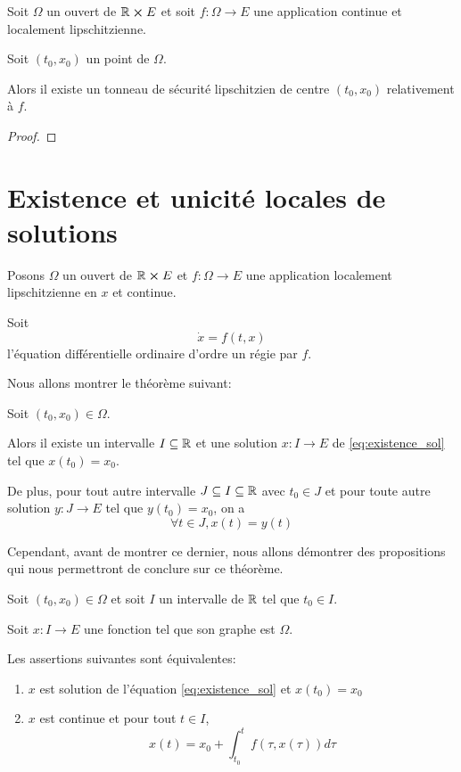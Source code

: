 \documentclass[a4paper, 11pt]{report}
\begin{document}
\begin{proposition}
	Soit $\Omega$ un ouvert de $\mathbb{R} \cross E$ et soit $f : \Omega
	\rightarrow E$ une application continue et localement lipschitzienne.

	Soit $(t_{0}, x_{0})$ un point de $\Omega$.

	Alors il existe un tonneau de sécurité lipschitzien de centre $(t_{0},
	x_{0})$ relativement à $f$.
\end{proposition}

\ifdefined\outputproof
\begin{proof}

\end{proof}
\fi

\section{Existence et unicité locales de solutions}

Posons $\Omega$ un ouvert de $\mathbb{R} \cross E$ et $f : \Omega
\rightarrow E$ une application localement lipschitzienne en
$x$ et continue.

Soit
\begin{equation}
	\dot{x} = f(t, x)
	\label{eq:existence_sol}
\end{equation}
l'équation différentielle ordinaire d'ordre un régie par $f$.

Nous allons montrer le théorème suivant:

\begin{theorem}
	Soit $(t_{0}, x_{0}) \in \Omega$.

	Alors il existe un intervalle $I \subseteq \mathbb{R}$ et une solution $x :
	I \rightarrow E$ de \ref{eq:existence_sol} tel que $x(t_{0}) =
	x_{0}$.

	De plus, pour tout autre intervalle $J \subseteq I \subseteq \mathbb{R}$ avec
	$t_{0} \in J$ et pour toute autre solution $y : J \rightarrow
	E$ tel que $y(t_{0}) = x_{0}$, on a
	\begin{equation}
		\forall t \in J, x(t) = y(t)
	\end{equation}
\end{theorem}

Cependant, avant de montrer ce dernier, nous allons démontrer des propositions
qui nous permettront de conclure sur ce théorème.

\begin{proposition}
	Soit $(t_{0}, x_{0}) \in \Omega$ et soit $I$ un intervalle de $\mathbb{R}$ tel que $t_{0}
	\in I$.

	Soit $x : I \rightarrow E$ une fonction tel que son graphe est $\Omega$.

	Les assertions suivantes sont équivalentes:
	\begin{enumerate}
		\item $x$ est solution de l'équation \ref{eq:existence_sol} et $x(t_{0})
			= x_{0}$
		\item $x$ est continue et pour tout $t \in I$,
			\begin{equation}
				x(t) = x_{0} + \int_{t_{0}}^{t} f(\tau, x(\tau)) d\tau
			\end{equation}
	\end{enumerate}
\end{proposition}
\end{document}
